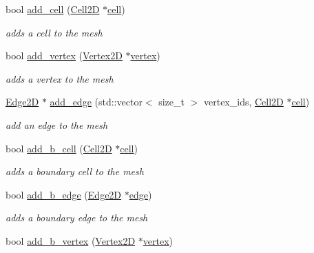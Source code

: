 \begin{DoxyCompactItemize}
bool \hyperlink{group__Mesh2D_gade16a0538259cbda82c5f8ef3b8b0580}{add\+\_\+cell} (\hyperlink{classHCore2D_1_1Cell2D}{Cell2D} $\ast$\hyperlink{classHCore2D_1_1Mesh2D_a1d8c40ea85f0abe3ae5aea23e4a95583}{cell})
\begin{DoxyCompactList}\small\item\em adds a cell to the mesh \end{DoxyCompactList}\item 
bool \hyperlink{group__Mesh2D_ga2783ade161f3f26b0b2cd9d2d529ece9}{add\+\_\+vertex} (\hyperlink{classHCore2D_1_1Vertex2D}{Vertex2D} $\ast$\hyperlink{classHCore2D_1_1Mesh2D_ac29a7c5c0c36b3aa519520fbb9cf20de}{vertex})
\begin{DoxyCompactList}\small\item\em adds a vertex to the mesh \end{DoxyCompactList}\item 
\mbox{\label{classHCore2D_1_1Mesh2D_af9587d7b5a27cc83df1c51d5eaa43aaf}} 
\hyperlink{classHCore2D_1_1Edge2D}{Edge2D} $\ast$ \hyperlink{classHCore2D_1_1Mesh2D_af9587d7b5a27cc83df1c51d5eaa43aaf}{add\+\_\+edge} (std\+::vector$<$ size\+\_\+t $>$ vertex\+\_\+ids, \hyperlink{classHCore2D_1_1Cell2D}{Cell2D} $\ast$\hyperlink{classHCore2D_1_1Mesh2D_a1d8c40ea85f0abe3ae5aea23e4a95583}{cell})
\begin{DoxyCompactList}\small\item\em add an edge to the mesh \end{DoxyCompactList}\item 
bool \hyperlink{group__Mesh2D_gabcbcf3d063fba4f53af4dcf36f91362b}{add\+\_\+b\+\_\+cell} (\hyperlink{classHCore2D_1_1Cell2D}{Cell2D} $\ast$\hyperlink{classHCore2D_1_1Mesh2D_a1d8c40ea85f0abe3ae5aea23e4a95583}{cell})
\begin{DoxyCompactList}\small\item\em adds a boundary cell to the mesh \end{DoxyCompactList}\item 
bool \hyperlink{group__Mesh2D_ga108fe5f6579a3c2e832df1119c5f9b8c}{add\+\_\+b\+\_\+edge} (\hyperlink{classHCore2D_1_1Edge2D}{Edge2D} $\ast$\hyperlink{classHCore2D_1_1Mesh2D_a9dd54d7b118e6f645d9af819a7555e93}{edge})
\begin{DoxyCompactList}\small\item\em adds a boundary edge to the mesh \end{DoxyCompactList}\item 
bool \hyperlink{group__Mesh2D_ga123f249e032a7893b211e7ea6a2af42a}{add\+\_\+b\+\_\+vertex} (\hyperlink{classHCore2D_1_1Vertex2D}{Vertex2D} $\ast$\hyperlink{classHCore2D_1_1Mesh2D_ac29a7c5c0c36b3aa519520fbb9cf20de}{vertex})

\end{DoxyCompactItemize}
